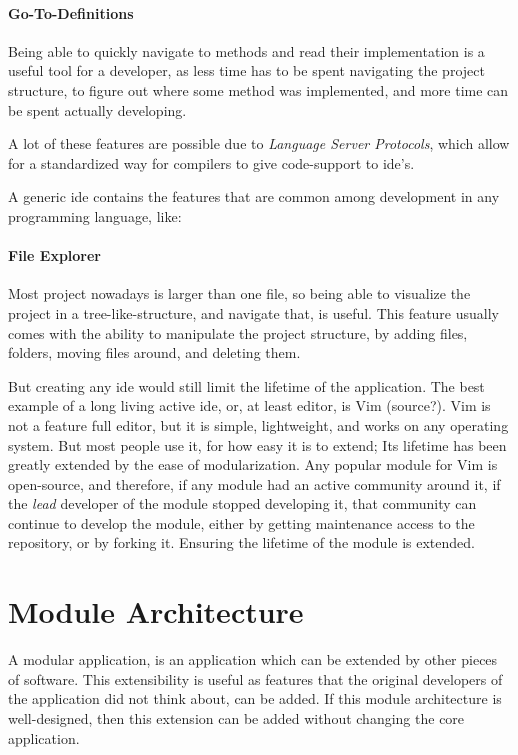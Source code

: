 \paragraph{Go-To-Definitions} Being able to quickly navigate to methods and read
their implementation is a useful tool for a developer, as less time has to be
spent navigating the project structure, to figure out where some method was
implemented, and more time can be spent actually developing.

A lot of these features are possible due to \textit{Language Server Protocols},
which allow for a standardized way for compilers to give code-support to
\gls{ide}'s.

A generic \gls{ide} contains the features that are common among development in
any programming language, like:

\paragraph{File Explorer} Most project nowadays is larger than one file, so
being able to visualize the project in a tree-like-structure, and navigate that,
is useful. This feature usually comes with the ability to manipulate the project
structure, by adding files, folders, moving files around, and deleting them.

But creating any \gls{ide} would still limit the lifetime of the application.
The best example of a long living active \gls{ide}, or, at least editor, is Vim
(source?). Vim is not a feature full editor, but it is simple, lightweight, and
works on any operating system. But most people use it, for how easy it is to
extend; Its lifetime has been greatly extended by the ease of modularization.
Any popular module for Vim is open-source, and therefore, if any module had an
active community around it, if the \textit{lead} developer of the module stopped
developing it, that community can continue to develop the module, either by
getting maintenance access to the repository, or by forking it. Ensuring the
lifetime of the module is extended.

\section{Module Architecture}


A modular application, is an application which can be extended by other pieces
of software. This extensibility is useful as features that the original
developers of the application did not think about, can be added. If this module
architecture is well-designed, then this extension can be added without changing
the core application.

